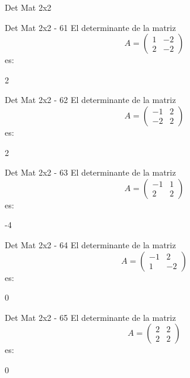 \documentclass[a4,11pt]{aleph-notas}
\begin{document}
\begin{quiz}{Det Mat 2x2}
\begin{numerical}[tolerance=0]%
    {Det Mat 2x2 - 61}
    El determinante de la matriz
    \[
        A = \begin{pmatrix} 1 & -2 \\ 2 & -2 \end{pmatrix}
    \]
    es:
    \item[] 2
\end{numerical}

\begin{numerical}[tolerance=0]%
    {Det Mat 2x2 - 62}
    El determinante de la matriz
    \[
        A = \begin{pmatrix} -1 & 2 \\ -2 & 2 \end{pmatrix}
    \]
    es:
    \item[] 2
\end{numerical}

\begin{numerical}[tolerance=0]%
    {Det Mat 2x2 - 63}
    El determinante de la matriz
    \[
        A = \begin{pmatrix} -1 & 1 \\ 2 & 2 \end{pmatrix}
    \]
    es:
    \item[] -4
\end{numerical}

\begin{numerical}[tolerance=0]%
    {Det Mat 2x2 - 64}
    El determinante de la matriz
    \[
        A = \begin{pmatrix} -1 & 2 \\ 1 & -2 \end{pmatrix}
    \]
    es:
    \item[] 0
\end{numerical}

\begin{numerical}[tolerance=0]%
    {Det Mat 2x2 - 65}
    El determinante de la matriz
    \[
        A = \begin{pmatrix} 2 & 2 \\ 2 & 2 \end{pmatrix}
    \]
    es:
    \item[] 0
\end{numerical}


\end{quiz}
\end{document}
